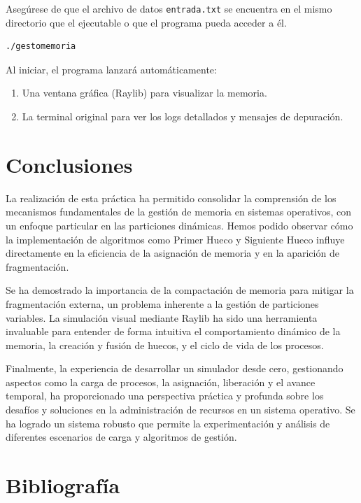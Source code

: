 \documentclass[11pt,a4paper]{article}
\begin{document}
Asegúrese de que el archivo de datos \texttt{entrada.txt} se encuentra en el mismo directorio que el ejecutable o que el programa pueda acceder a él.

\begin{lstlisting}[language=bash, caption={Ejecución del programa}]
./gestomemoria
\end{lstlisting}

Al iniciar, el programa lanzará automáticamente:
\begin{enumerate}
    \item Una ventana gráfica (Raylib) para visualizar la memoria.
    \item La terminal original para ver los logs detallados y mensajes de depuración.
\end{enumerate}

\section{Conclusiones}

La realización de esta práctica ha permitido consolidar la comprensión de los mecanismos fundamentales de la gestión de memoria en sistemas operativos, 
con un enfoque particular en las particiones dinámicas. Hemos podido observar cómo la implementación de algoritmos como Primer Hueco y Siguiente Hueco 
influye directamente en la eficiencia de la asignación de memoria y en la aparición de fragmentación.

Se ha demostrado la importancia de la compactación de memoria para mitigar la fragmentación externa, un problema inherente a la gestión de particiones 
variables. La simulación visual mediante Raylib ha sido una herramienta invaluable para entender de forma intuitiva el comportamiento dinámico de la memoria, 
la creación y fusión de huecos, y el ciclo de vida de los procesos.

Finalmente, la experiencia de desarrollar un simulador desde cero, gestionando aspectos como la carga de procesos, la asignación, liberación y el avance 
temporal, ha proporcionado una perspectiva práctica y profunda sobre los desafíos y soluciones en la administración de recursos en un sistema operativo. 
Se ha logrado un sistema robusto que permite la experimentación y análisis de diferentes escenarios de carga y algoritmos de gestión.

\section{Bibliografía}
\end{document}
